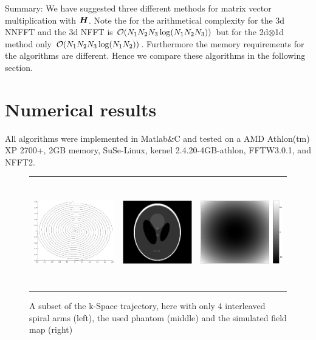 \documentclass[journal]{IEEEtran}
\newcommand{\zb}[1]{\mbox{\boldmath{${#1}$}}}
\numberwithin{equation}{section}
\numberwithin{table}{section}
\numberwithin{figure}{section}
\begin{document}
Summary: We have suggested three different methods for matrix vector
multiplication with $\zb H$. Note the for the arithmetical complexity
for the 3d NNFFT and the 3d NFFT is ${\cal
  O}(N_1N_2N_3\log(N_1N_2N_3))$ but for the 2d$\otimes$1d method only 
 ${\cal  O}(N_1N_2N_3\log(N_1N_2))$. Furthermore the memory
 requirements for the algorithms are different. Hence we compare these
 algorithms in the following section.
 
\section{Numerical results}\label{Sec:Num}
All algorithms were implemented in Matlab\&C and tested on a AMD Athlon(tm) XP
2700+, 2GB memory, SuSe-Linux, kernel 2.4.20-4GB-athlon, FFTW3.0.1, and NFFT2.


\begin{figure}[ht] 
\centering
\begin{tabular}{ccc}
\includegraphics[height=4.7cm]{pics/spiral.jpg} &
\includegraphics[height=4.7cm]{pics/phantom_original.jpg} &
\includegraphics[height=4.7cm]{pics/fieldmap_simulated.jpg}
\end{tabular}
\caption{A subset of the k-Space trajectory, here with only 4
  interleaved spiral arms (left), the used phantom (middle) and the
  simulated field map (right)} 
\label{Fig:Phantom}
\end{figure}
\end{document}
